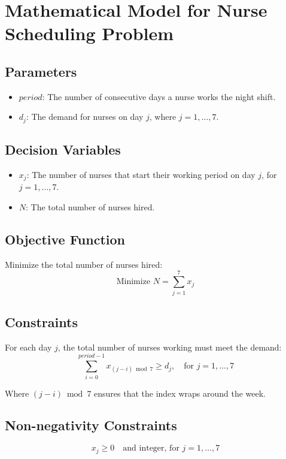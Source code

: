 \documentclass{article}
\begin{document}
\section*{Mathematical Model for Nurse Scheduling Problem}

\subsection*{Parameters}
\begin{itemize}
    \item $period$: The number of consecutive days a nurse works the night shift.
    \item $d_j$: The demand for nurses on day $j$, where $j = 1, \ldots, 7$.
\end{itemize}

\subsection*{Decision Variables}
\begin{itemize}
    \item $x_j$: The number of nurses that start their working period on day $j$, for $j = 1, \ldots, 7$.
    \item $N$: The total number of nurses hired.
\end{itemize}

\subsection*{Objective Function}
Minimize the total number of nurses hired:
\[
\text{Minimize } N = \sum_{j=1}^{7} x_j
\]

\subsection*{Constraints}
For each day $j$, the total number of nurses working must meet the demand:
\[
\sum_{i=0}^{period-1} x_{(j-i) \bmod 7} \geq d_j, \quad \text{for } j = 1, \ldots, 7
\]

Where $(j-i) \bmod 7$ ensures that the index wraps around the week.

\subsection*{Non-negativity Constraints}
\[
x_j \geq 0 \quad \text{and integer, for } j = 1, \ldots, 7
\]
\end{document}
